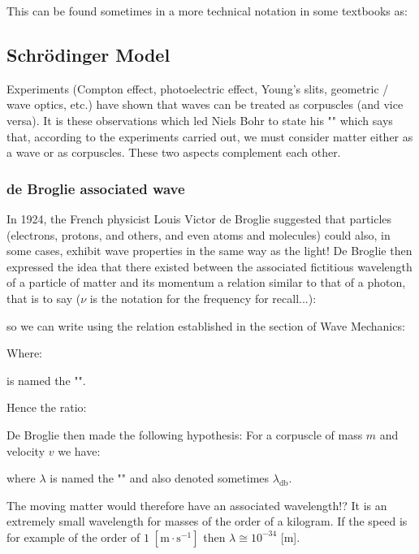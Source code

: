 	This can be found sometimes in a more technical notation in some textbooks as:
	
	
	\subsection{Schrödinger Model}
	Experiments (Compton effect, photoelectric effect, Young's slits, geometric / wave optics, etc.) have shown that waves can be treated as corpuscles (and vice versa). It is these observations which led Niels Bohr to state his "" which says that, according to the experiments carried out, we must consider matter either as a wave or as corpuscles. These two aspects complement each other.
	
	\subsubsection{de Broglie associated wave}\label{de broglie associated wave}
	In 1924, the French physicist Louis Victor de Broglie suggested that particles (electrons, protons, and others, and even atoms and molecules) could also, in some cases, exhibit wave properties in the same way as the light! De Broglie then expressed the idea that there existed between the associated fictitious wavelength of a particle of matter and its momentum a relation similar to that of a photon, that is to say ($\nu$ is the notation for the frequency for recall...):
	
	so we can write using the relation established in the section of Wave Mechanics:
	
	Where:
	
	is named the "\label{de Broglie relation}".
	
	Hence the ratio:
	
	De Broglie then made the following hypothesis: For a corpuscle of mass $m$ and velocity $v$ we have:
	
	where $\lambda$ is named the "\label{de Broglie wavelength}" and also denoted sometimes $\lambda_{\text{db}}$.
	
	The moving matter would therefore have an associated wavelength!? It is an extremely small wavelength for masses of the order of a kilogram. If the speed is for example of the order of $1\;[\text{m}\cdot\text{s}^{-1}]$ then $\lambda\cong 10^{-34}$ [m].

